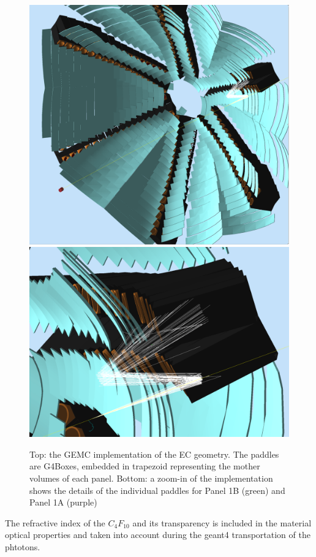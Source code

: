 \begin{figure}
	\centering
	\includegraphics[width=0.95\columnwidth,keepaspectratio]{img/ltccGeometry.png}
	\includegraphics[width=0.95\columnwidth,keepaspectratio]{img/ltccDetail.png}
	\caption{Top: the GEMC implementation of the EC geometry. The paddles are G4Boxes, embedded in trapezoid representing the mother volumes of each panel.
            Bottom: a zoom-in of the implementation shows the details of the individual paddles for Panel 1B (green) and Panel 1A (purple) }
	\label{fig:ecGeometry}
\end{figure}

The refractive index of the $C_4F_10$ and its transparency is included in the material optical properties and taken
into account during the geant4 transportation of the phtotons.

